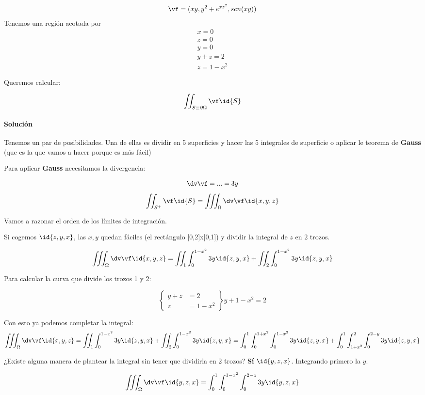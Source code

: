 \begin{example}
\[\vf = (xy,y^2+e^{xz^2},sen(xy))\]
Tenemos una región acotada por
\begin{gather*}
x=0\\
z=0\\
y=0\\
y+z=2\\
z=1-x^2
\end{gather*}

Queremos calcular:

\[\iint_{S\equiv\partial \Omega} \vf \id{S}\]


\paragraph{Solución}

Tenemos un par de posibilidades. Una de ellas es dividir en 5 superficies y hacer las 5 integrales de superficie o aplicar le teorema de \textbf{Gauss} (que es la que vamos a hacer porque es más fácil)

Para aplicar \textbf{Gauss} necesitamos la divergencia:

\[\dv\vf = ... = 3y\]
\[
\iint_{S^+} \vf \id{S} = \iiint_{\Omega} \dv\vf \id{x,y,z}
\]

Vamos a razonar el orden de los límites de integración.

Si cogemos $\id{z,y,x}$, las $x,y$ quedan fáciles (el rectángulo [0,2]x[0,1]) y dividir la integral de $z$ en 2 trozos.

\[
\iiint_{\Omega} \dv\vf \id{x,y,z} = \iint_{1} \int_0^{1-x^2} 3y\id{z,y,x} + \iint_{2} \int_0^{1-x^2} 3y\id{z,y,x}
\]

Para calcular la curva que divide los trozos 1 y 2:

\[\left\{\begin{array}{cc}
y+z&=2\\
z&=1-x^2
\end{array} \right\} y+1-x^2=2\]

Con esto ya podemos completar la integral:
\[
\iiint_{\Omega} \dv\vf \id{x,y,z} = \iint_{1} \int_0^{1-x^2} 3y\id{z,y,x} + \iint_{2} \int_0^{1-x^2} 3y\id{z,y,x} = \int_0^1\int_0^{1+x^2}\int_0^{1-x^2}3y\id{z,y,x}+\int_0^1\int_{1+x^2}^{2}\int_0^{2-y}3y\id{z,y,x}
\]

¿Existe alguna manera de plantear la integral sin tener que dividirla en 2 trozos? \textbf{Sí} $\id{y,z,x}$. Integrando primero la $y$.

\[
\iiint_{\Omega} \dv\vf\id{y,z,x} = \int_0^1\int_0^{1-x^2}\int_0^{2-z}3y\id{y,z,x}
\]

\end{example}

